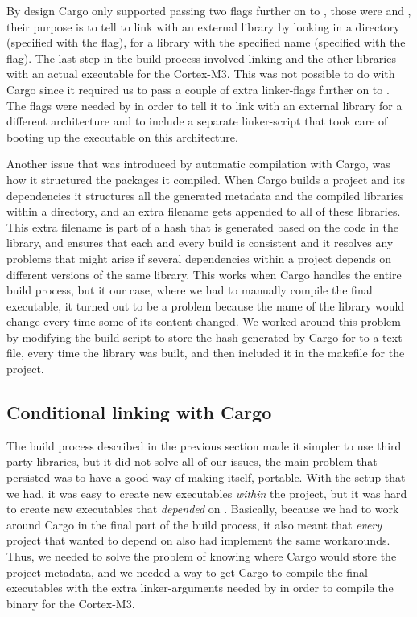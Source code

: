 By design Cargo only supported passing two flags further on to {\rustc}, those were  and , their purpose is to tell {\rustc} to link with an external library by looking in a directory (specified with the  flag), for a library with the specified name (specified with the  flag).
The last step in the build process involved linking {\emlib} and the other libraries with an actual executable for the Cortex-M3.
This was not possible to do with Cargo since it required us to pass a couple of extra linker-flags further on to {\rustc}.
The flags were needed by {\rustc} in order to tell it to link with an external library for a different architecture and to include a separate linker-script that took care of booting up the executable on this architecture.

Another issue that was introduced by automatic compilation with Cargo, was how it structured the packages it compiled.
When Cargo builds a project and its dependencies it structures all the generated metadata and the compiled libraries within a  directory, and an extra filename gets appended to all of these libraries.
This extra filename is part of a hash that is generated based on the code in the library, and ensures that each and every build is consistent and it resolves any problems that might arise if several dependencies within a project depends on different versions of the same library.
This works when Cargo handles the entire build process, but it our case, where we had to manually compile the final executable, it turned out to be a problem because the name of the library would change every time some of its content changed.
We worked around this problem by modifying the build script to store the hash generated by Cargo for {\emlib} to a text file, every time the library was built, and then included it in the makefile for the project.

\subsection{Conditional linking with Cargo}

The build process described in the previous section made it simpler to use third party libraries, but it did not solve all of our issues, the main problem that persisted was to have a good way of making {\emlib} itself, portable.
With the setup that we had, it was easy to create new executables \emph{within} the project, but it was hard to create new executables that \emph{depended} on {\emlib}.
Basically, because we had to work around Cargo in the final part of the build process, it also meant that \emph{every} project that wanted to depend on {\emlib} also had implement the same workarounds.
Thus, we needed to solve the problem of knowing where Cargo would store the project metadata, and we needed a way to get Cargo to compile the final executables with the extra linker-arguments needed by {\rustc} in order to compile the binary for the Cortex-M3.

